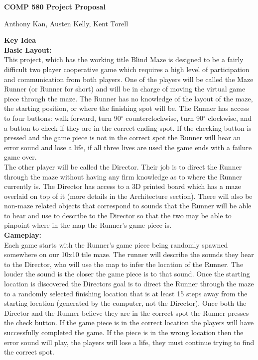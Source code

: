 \documentclass[12pt]{article}
\begin{document}
\centerline{\large \textbf{COMP 580 Project Proposal}}
\centerline{Anthony Kan, Austen Kelly, Kent Torell}
\vskip 0.5cm

\textbf{\large Key Idea}\\
\textbf{Basic Layout:}\\
\indent This project, which has the working title Blind Maze is designed to be a fairly difficult two player cooperative game which requires a high level of participation and communication from both players.  One of the players will be called the Maze Runner (or Runner for short) and will be in charge of moving the virtual game piece through the maze.  The Runner has no knowledge of the layout of the maze, the starting position, or where the finishing spot will be. The Runner has access to four buttons: walk forward, turn 90$^\circ$ counterclockwise, turn 90$^\circ$ clockwise, and a button to check if they are in the correct ending spot.  If the checking button is pressed and the game piece is not in the correct spot the Runner will hear an error sound and lose a life, if all three lives are used the game ends with a failure game over.\\
\indent The other player will be called the Director. Their job is to direct the Runner through the maze without having any firm knowledge as to where the Runner currently is. The Director has access to a 3D printed board which has a maze overlaid on top of it (more details in the Architecture section).  There will also be non-maze related objects that correspond to sounds that the Runner will be able to hear and use to describe to the Director so that the two may be able to pinpoint where in the map the Runner's game piece is.\\
\textbf{Gameplay:}\\
\indent Each game starts with the Runner's game piece being randomly spawned somewhere on our 10x10 tile maze.  The runner will describe the sounds they hear to the Director, who will use the map to infer the location of the Runner.  The louder the sound is the closer the game piece is to that sound.  Once the starting location is discovered the Directors goal is to direct the Runner through the maze to a randomly selected finishing location that is at least 15 steps away from the starting location (generated by the computer, not the Director).  Once both the Director and the Runner believe they are in the correct spot the Runner presses the check button.  If the game piece is in the correct location the players will have successfully completed the game.  If the piece is in the wrong location then the error sound will play, the players will lose a life, they must continue trying to find the correct spot.\\
\end{document}
